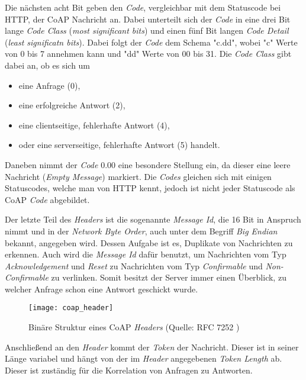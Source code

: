 Die nächsten acht Bit geben den \textit{Code}, vergleichbar mit dem Statuscode bei HTTP, der CoAP Nachricht an. Dabei unterteilt sich der \textit{Code} in eine drei Bit lange \textit{Code Class} (\textit{most significant bits}) und einen fünf Bit langen \textit{Code Detail} (\textit{least significatn bits}). Dabei folgt der \textit{Code} dem Schema "c.dd", wobei "c" Werte von 0 bis 7 annehmen kann und "dd" Werte von 00 bis 31. Die \textit{Code Class} gibt dabei an, ob es sich um
\begin{itemize}
    \item eine Anfrage (0),
    \item eine erfolgreiche Antwort (2),
    \item eine clientseitige, fehlerhafte Antwort (4),
    \item oder eine serverseitige, fehlerhafte Antwort (5) handelt.
\end{itemize}

Daneben nimmt der \textit{Code} 0.00 eine besondere Stellung ein, da dieser eine leere Nachricht (\textit{Empty Message}) markiert. Die \textit{Codes} gleichen sich mit einigen Statuscodes, welche man von HTTP kennt, jedoch ist nicht jeder Statuscode als CoAP \textit{Code} abgebildet.

Der letzte Teil des \textit{Headers} ist die sogenannte \textit{Message Id}, die 16 Bit in Anspruch nimmt und in der \textit{Network Byte Order}, auch unter dem Begriff \textit{Big Endian} bekannt, angegeben wird. Dessen Aufgabe ist es, Duplikate von Nachrichten zu erkennen. Auch wird die \textit{Message Id} dafür benutzt, um Nachrichten vom Typ \textit{Acknowledgement} und \textit{Reset} zu Nachrichten vom Typ \textit{Confirmable} und \textit{Non-Confirmable} zu verlinken. Somit besitzt der Server immer einen Überblick, zu welcher Anfrage schon eine Antwort geschickt wurde.

\begin{figure}[h]
    \centering
    \texttt{[image: coap\_header]}
    \caption{Binäre Struktur eines CoAP \textit{Headers} (Quelle: RFC 7252 \autocite{RFC7252})}
    \label{fig:binaere-sturktur-eines-coap-headers}
\end{figure}

Anschließend an den \textit{Header} kommt der \textit{Token} der Nachricht. Dieser ist in seiner Länge variabel und hängt von der im \textit{Header} angegebenen \textit{Token Length} ab. Dieser ist zuständig für die Korrelation von Anfragen zu Antworten.

